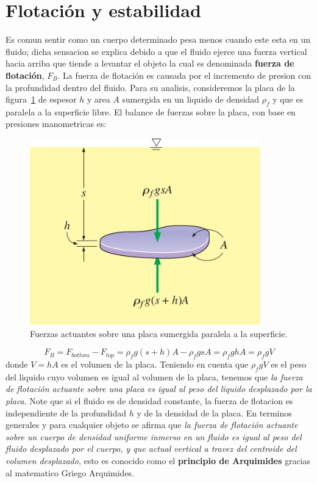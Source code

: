 \documentclass[10pt, oneside]{article}
\begin{document}
\section{Flotaci\'on y estabilidad}
Es comun sentir como un cuerpo determinado pesa menos cuando este esta en un fluido; dicha sensacion se explica debido a que el fluido ejerce una fuerza vertical hacia arriba que tiende a levantar el objeto la cual es denominada \textbf{fuerza de flotaci\'on}, $F_B$. La fuerza de flotaci\'on es causada por el incremento de presion con la profundidad dentro del fluido. Para su analisis, consideremos la placa de la figura~\ref{flota} de espesor $h$ y area $A$ sumergida en un liquido de densidad $\rho_f$ y que es paralela a la superficie libre. El balance de fuerzas sobre la placa, con base en presiones manometricas es:
\begin{figure}[h]
\centering
\includegraphics[width=10cm]{flota}
\caption{Fuerzas actuantes sobre una placa sumergida paralela a la superficie.}
\label{flota}
\end{figure}

\begin{equation}
F_B=F_{bottom} - F_{top} = \rho_f g (s+h)A - \rho_f gs A = \rho_f ghA = \rho_f g V
\label{FB}
\end{equation}
donde $V=hA$ es el volumen de la placa. Teniendo en cuenta que $\rho_f g V$ es el peso del liquido cuyo volumen es igual al volumen de la placa, tenemos que \emph{la fuerza de flotaci\'on actuante sobre una placa es igual al peso del liquido desplazado por la placa}. Note que si el fluido es de densidad constante, la fuerza de flotacion es independiente de la profundidad $h$ y  de la densidad de la placa. En terminos generales y para cualquier objeto se afirma que \emph{la fuerza de flotaci\'on actuante sobre un cuerpo de densidad uniforme inmerso en un fluido es igual al peso del fluido desplazado por el cuerpo, y que actual vertical a travez del centroide del volumen desplazado}, esto es conocido como el \textbf{principio de Arquimides} gracias al matematico Griego Arquimides. 
\end{document}
